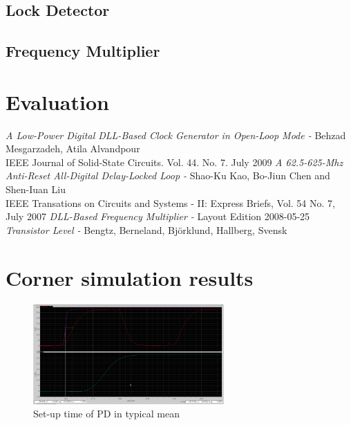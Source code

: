 \documentclass[a4paper,12pt]{article} \usepackage{graphicx}
\begin{document}
\subsection{Lock Detector}
\subsection{Frequency Multiplier}

\section{Evaluation}

\newpage
\appendix 
\newpage

\begin{thebibliography}{99}
        \textit{A Low-Power Digital DLL-Based Clock Generator in Open-Loop Mode - }
                Behzad Mesgarzadeh, Atila Alvandpour \\
                IEEE Journal of Solid-State Circuits. Vol. 44. No. 7. July 2009
        \textit{A 62.5-625-Mhz Anti-Reset All-Digital Delay-Locked Loop - }
                Shao-Ku Kao, Bo-Jiun Chen and Shen-Iuan Liu \\
                IEEE Transations on Circuits and Systems - II: Express Briefs, Vol. 54 No. 7, July 2007
        \textit{DLL-Based Frequency Multiplier - }
                Layout Edition 2008-05-25 \\
        \textit{Transistor Level - }
                Bengtz, Berneland, Björklund, Hallberg, Svensk \\

\end{thebibliography}

\newpage
\section{Corner simulation results}
\label{sec:corners}

\begin{figure}[h]
  \centering
  \includegraphics[width=0.65\textwidth]{../Bilder/Layout/pd_tm.png}
  \caption{Set-up time of PD in typical mean}
  \label{fig:PDtm}
\end{figure}
\end{document}
